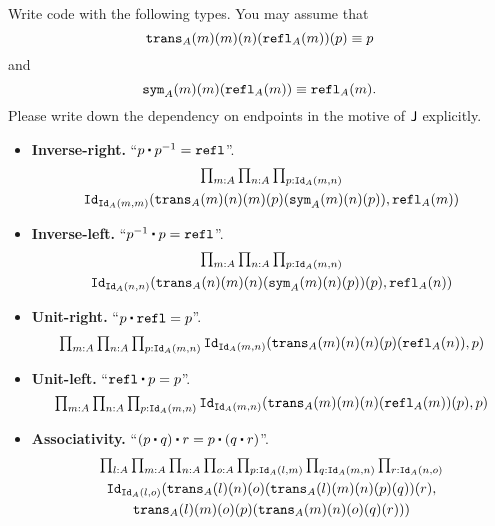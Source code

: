 \documentclass[12pt]{article}
\newcommand{\markextra}[1]{\color{DarkOliveGreen}#1\normalcolor}
\begin{document}
\begin{task}
  Write code with the following types.
  You may assume that
  \[
    \mathtt{trans}_A(m)(m)(n)(\mathtt{refl}_A(m))(p) \equiv p
  \]
  and
  \markextra{
  \[
    \mathtt{sym}_A(m)(m)(\mathtt{refl}_A(m)) \equiv \mathtt{refl}_A(m).
  \]
  }
  Please write down the dependency on endpoints in the motive of $\mathsf{J}$ explicitly.
  \begin{itemize}
    \item
      \textbf{Inverse-right.}
      ``$p \concat p^{-1} = \refl$''.
      \begin{multline*}
        \textstyle
        \prod_{m{:}A}\prod_{n{:}A}\prod_{p{:}\mathtt{Id}_A(m,n)}\\
          \mathtt{Id}_{\mathtt{Id}_A(m,m)}(\mathtt{trans}_A(m)(n)(m)(p)(\mathtt{sym}_A(m)(n)(p)), \mathtt{refl}_A(m))
      \end{multline*}
    \item
      \textbf{Inverse-left.}
      ``$p^{-1} \concat p = \refl$''.
      \begin{multline*}
        \textstyle
        \prod_{m{:}A}\prod_{n{:}A}\prod_{p{:}\mathtt{Id}_A(m,n)}\\
        \mathtt{Id}_{\mathtt{Id}_A(n,n)}(\mathtt{trans}_A(n)(m)(n)(\mathtt{sym}_A(m)(n)(p))(p), \mathtt{refl}_A(n))
      \end{multline*}
    \item
      \textbf{Unit-right.}
      ``$p \concat \refl = p$''.
      \begin{multline*}
        \textstyle
        \prod_{m{:}A}\prod_{n{:}A}\prod_{p{:}\mathtt{Id}_A(m,n)}\mathtt{Id}_{\mathtt{Id}_A(m,n)}(\mathtt{trans}_A(m)(n)(n)(p)(\mathtt{refl}_A(n)), p)
      \end{multline*}

    \item
      \textbf{Unit-left.}
      ``$\refl \concat p = p$''.
      \[
        \textstyle
        \prod_{m{:}A}\prod_{n{:}A}\prod_{p{:}\mathtt{Id}_A(m,n)}\mathtt{Id}_{\mathtt{Id}_A(m,n)}(\mathtt{trans}_A(m)(m)(n)(\mathtt{refl}_A(m))(p), p)
      \]

    \item
      \textbf{Associativity.}
      ``$(p \concat q) \concat r = p \concat (q \concat r)$''.
      \begin{multline*}
        \textstyle
        \prod_{l{:}A}\prod_{m{:}A}\prod_{n{:}A}\prod_{o{:}A}\prod_{p{:}\mathtt{Id}_A(l,m)}\prod_{q{:}\mathtt{Id}_A(m,n)}\prod_{r{:}\mathtt{Id}_A(n,o)}
        \\
        \mathtt{Id}_{\mathtt{Id}_A(l,o)}(\mathtt{trans}_A(l)(n)(o)(\mathtt{trans}_A(l)(m)(n)(p)(q))(r),
        \\
        \mathtt{trans}_A(l)(m)(o)(p)(\mathtt{trans}_A(m)(n)(o)(q)(r)))
      \end{multline*}
  \end{itemize}
\end{task}
\end{document}
